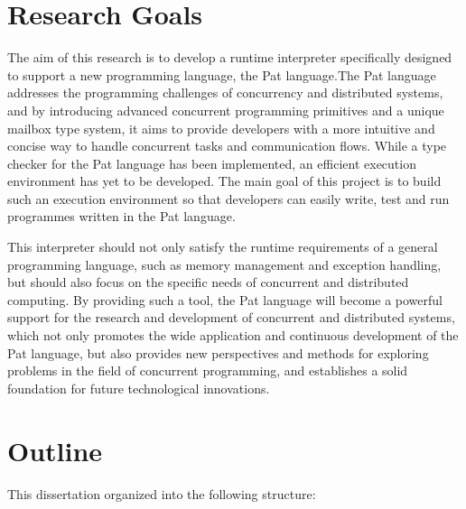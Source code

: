\documentclass{l4proj}
\begin{document}
\section{Research Goals}

The aim of this research is to develop a runtime interpreter specifically designed to support a new programming language, the Pat language.The Pat language addresses the programming challenges of concurrency and distributed systems, and by introducing advanced concurrent programming primitives and a unique mailbox type system, it aims to provide developers with a more intuitive and concise way to handle concurrent tasks and communication flows. While a type checker for the Pat language has been implemented, an efficient execution environment has yet to be developed. The main goal of this project is to build such an execution environment so that developers can easily write, test and run programmes written in the Pat language.

This interpreter should not only satisfy the runtime requirements of a general programming language, such as memory management and exception handling, but should also focus on the specific needs of concurrent and distributed computing. By providing such a tool, the Pat language will become a powerful support for the research and development of concurrent and distributed systems, which not only promotes the wide application and continuous development of the Pat language, but also provides new perspectives and methods for exploring problems in the field of concurrent programming, and establishes a solid foundation for future technological innovations.

\section{Outline}
This dissertation organized into the following structure:
\end{document}
